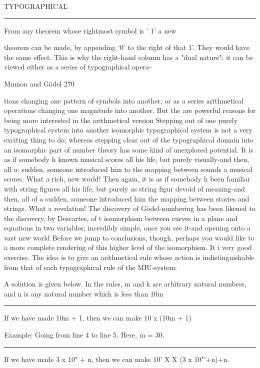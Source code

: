 TYPOGRAPHICAL \rule I: From any theorem whose rightmost symbol is ' 1' a new\par

theorem can be made, by appending `0' to the right of that 1'.
They would have the same effect. This is why the right-hand column has a "dual nature":
it can be viewed either as a series of typographical opera-




Mumon and Gödel                                                                        270

tions changing one pattern of symbols into another, or as a series arithmetical operations
changing one magnitude into another. But the are powerful reasons for being more
interested in the arithmetical version Stepping out of one purely typographical system
into another isomorphic typographical system is not a very exciting thing to do; whereas
stepping clear out of the typographical domain into an isomorphic part of number theory
has some kind of unexplored potential. It is as if somebody h known musical scores all
his life, but purely visually-and then, all o: sudden, someone introduced him to the
mapping between sounds a musical scores. What a rich, new world! Then again, it is as if
somebody h been familiar with string figures all his life, but purely as string figur devoid
of meaning-and then, all of a sudden, someone introduced him the mapping between
stories and strings. What a revelation! The discovery of Gödel-numbering has been
likened to the discovery, by Descartes, of t isomorphism between curves in a plane and
equations in two variables; incredibly simple, once you see it-and opening onto a vast
new world
        Before we jump to conclusions, though, perhaps you would like to a more
complete rendering of this higher level of the isomorphism. It i very good exercise. The
idea is to give an arithmetical rule whose action is indistinguishable from that of each
typographical rule of the MIU-system:

A solution is given below. In the rules, m and k are arbitrary natural numbers, and n is
any natural number which is less than 10m

\rule 1: If we have made 10m + 1, then we can make 10 x (10m + 1)\par

Example: Going from line 4 to line 5. Here, m = 30.

\rule 2: If we have made 3 x 10" + n, then we can make 10' X X (3 x 10"'+n)+n.\par

